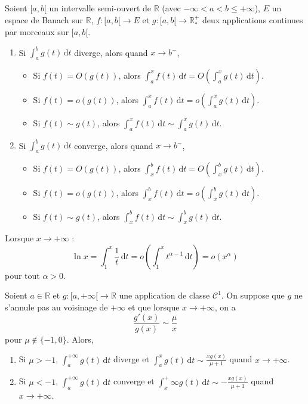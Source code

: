 
	\begin{theorem}
		Soient $[a,b[$ un intervalle semi-ouvert de $\mathbb{R}$ (avec $-\infty < a < b \leq +\infty$), $E$ un espace de Banach sur $\mathbb{R}$, $f : [a,b[ \rightarrow E$ et $g : [a,b[ \rightarrow \mathbb{R}^+_*$ deux applications continues par morceaux sur $[a,b[$.
		\begin{enumerate}[label=(\roman*)]
			\item Si $\int_a^b g(t) \, \mathrm{d}t$ diverge, alors quand $x \rightarrow b^-$,
			\begin{itemize}
				\item Si $f(t) = O(g(t))$, alors $\int_a^x f(t) \, \mathrm{d}t = O\left( \int_a^x g(t) \, \mathrm{d}t \right)$.
				\item Si $f(t) = o(g(t))$, alors $\int_a^x f(t) \, \mathrm{d}t = o\left( \int_a^x g(t) \, \mathrm{d}t \right)$.
				\item Si $f(t) \sim g(t)$, alors $\int_a^x f(t) \, \mathrm{d}t \sim \int_a^x g(t) \, \mathrm{d}t$.
			\end{itemize}
			\item Si $\int_a^b g(t) \, \mathrm{d}t$ converge, alors quand $x \rightarrow b^-$,
			\begin{itemize}
				\item Si $f(t) = O(g(t))$, alors $\int_x^b f(t) \, \mathrm{d}t = O\left( \int_x^b g(t) \, \mathrm{d}t \right)$.
				\item Si $f(t) = o(g(t))$, alors $\int_x^b f(t) \, \mathrm{d}t = o\left( \int_x^b g(t) \, \mathrm{d}t \right)$.
				\item Si $f(t) \sim g(t)$, alors $\int_x^b f(t) \, \mathrm{d}t \sim \int_x^b g(t) \, \mathrm{d}t$.
			\end{itemize}
		\end{enumerate}
	\end{theorem}

	\begin{example}
		Lorsque $x \rightarrow +\infty$ :
		\[ \ln x = \int_1^x \frac{1}{t} \, \mathrm{d}t = o \left( \int_1^x t^{\alpha-1} \, \mathrm{d}t \right) = o(x^\alpha) \]
		pour tout $\alpha > 0$.
	\end{example}

	\begin{application}
		Soient $a \in \mathbb{R}$ et $g : [a, +\infty[ \rightarrow \mathbb{R}$ une application de classe $\mathcal{C}^1$. On suppose que $g$ ne s'annule pas au voisinage de $+\infty$ et que lorsque $x \rightarrow +\infty$, on a
		\[ \frac{g'(x)}{g(x)} \sim \frac{\mu}{x} \]
		pour $\mu \notin \{ -1, 0 \}$. Alors,
		\begin{enumerate}[label=(\roman*)]
			\item Si $\mu > -1$, $\int_a^{+\infty} g(t) \, \mathrm{d}t$ diverge et $\int_a^x g(t) \, \mathrm{d}t \sim \frac{xg(x)}{\mu + 1}$ quand $x \rightarrow +\infty$.
			\item Si $\mu < -1$, $\int_a^{+\infty} g(t) \, \mathrm{d}t$ converge et $\int_x^+\infty g(t) \, \mathrm{d}t \sim -\frac{xg(x)}{\mu + 1}$ quand $x \rightarrow +\infty$.
		\end{enumerate}
	\end{application}

